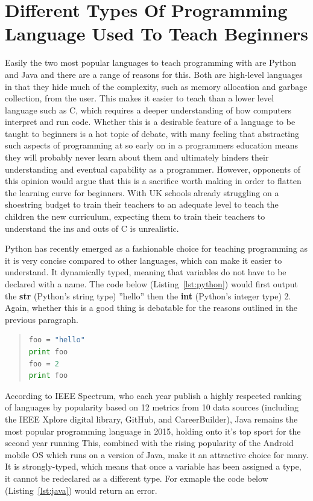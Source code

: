 \documentclass[ %
                    author={Jonathan Rankin},
                supervisor={Dr. David May, Dr. Ian Holyer},
                    degree={MEng},
                     title={CodeTouch},
                  subtitle={A Revolutionary Way To Program Real Code On Touch Screen Devices},
                      type={enterprise},
                      year={2015 } ]{dissertation}
\begin{document}
\section{Different Types Of Programming Language Used To Teach Beginners}\label{sec:teachL}

Easily the two most popular languages to teach programming with are Python and Java \cite{javapython}and there are a range of reasons for this. Both are high-level languages in that they hide much of the complexity, such as memory allocation and garbage collection, from the user. This makes it easier to teach than a lower level language such as C, which requires a deeper understanding of how computers interpret and run code. Whether this is a desirable feature of a language to be taught to beginners is a hot topic of debate, with many feeling that abstracting such aspects of programming at so early on in a programmers education means they will probably never learn about them and ultimately hinders their understanding and eventual capability as a programmer. However, opponents of this opinion would argue that this is a sacrifice worth making in order to flatten the learning curve for beginners. With UK schools already struggling on a shoestring budget to train their teachers to an adequate level to teach the children the new curriculum, expecting them to train their teachers to understand the ins and outs of C is unrealistic. 

Python has recently emerged as a fashionable choice for teaching programming as it is very concise compared to other languages, which can make it easier to understand. It dynamically typed, meaning that variables do not have to be declared with a name. The code below (Listing~\ref{lst:python}) would first output the \textbf{str} (Python's string type) ''hello'' then the \textbf{int} (Python's integer type) 2. Again, whether this is a good thing is debatable for the reasons outlined in the previous paragraph. 

\begin{quote}
\begin{lstlisting}[caption={Example Python code},label={lst:python},language=Python]
foo = "hello"
print foo
foo = 2
print foo
\end{lstlisting}
\label{lst:label}
\end{quote}

According to IEEE Spectrum, who each year publish a highly respected ranking of languages by popularity based on 12 metrics from 10 data sources (including the IEEE Xplore digital library, GitHub, and CareerBuilder), Java remains the most popular programming language in 2015, holding onto it's top sport for the second year running \cite{top}\. This, combined with the rising popularity of the Android mobile OS which runs on a version of Java, make it an attractive choice for many. It is strongly-typed, which means that once a variable has been assigned a type, it cannot be redeclared as a different type. For exmaple the code below (Listing~\ref{lst:java}) would return an error.
\end{document}
